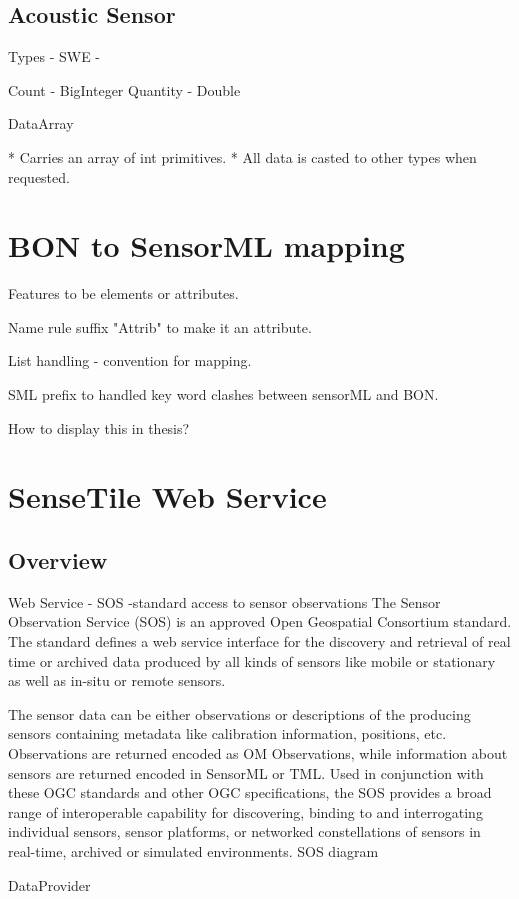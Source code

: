 \documentclass[]{final_report}
\begin{document}
\subsection{Acoustic Sensor}

Types
 - SWE -

Count - BigInteger
Quantity - Double

DataArray

 * Carries an array of int primitives.
 * All data is casted to other types when requested.


\newpage
\section{BON to SensorML mapping}
Features to be elements or attributes.

Name rule suffix "Attrib" to make it an attribute.

List handling - convention for mapping.

SML prefix to handled key word clashes between sensorML and BON.

How to display this in thesis?
\section{SenseTile Web Service}
\subsection{Overview}

Web Service - SOS -standard access to sensor observations
The Sensor Observation Service (SOS) is an approved Open Geospatial Consortium standard. The standard defines a web service interface for the discovery and retrieval of real time or archived data produced by all kinds of sensors like mobile or stationary as well as in-situ or remote sensors.

The sensor data can be either observations or descriptions of the producing sensors containing metadata like calibration information, positions, etc. Observations are returned encoded as OM Observations, while information about sensors are returned encoded in SensorML or TML. Used in conjunction with these OGC standards and other OGC specifications, the SOS provides a broad range of interoperable capability for discovering, binding to and interrogating individual sensors, sensor platforms, or networked constellations of sensors in real-time, archived or simulated environments. 
SOS diagram

DataProvider
\end{document}
